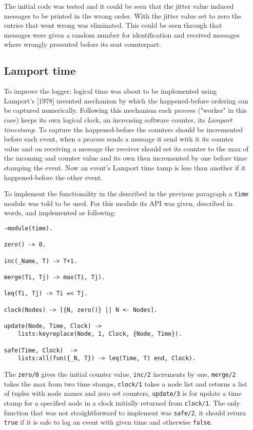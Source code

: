 \documentclass[a4paper, 11pt]{article}
\begin{document}
The initial code was tested and it could be seen that the jitter value induced messages to be printed in the wrong order. With the jitter value set to zero the entries that went wrong was eliminated. This could be seen through that messages were given a random number for identification and received messages where wrongly presented before its sent counterpart.

\subsection{Lamport time}

To improve the logger; logical time was about to be implemented using Lamport's [1978] invented mechanism by which the happened-before ordering can be captured numerically. Following this mechanism each process ("worker" in this case) keeps its own logical clock, an increasing software counter, its \textit{Lamport timestamp}. To capture the happened-before the counters should be incremented before each event, when a process sends a message it send with it its counter value and on receiving a message the receiver should set its counter to the max of the incoming and counter value and its own then incremented by one before time stamping the event. Now an event's Lamport time tamp is less than another if it happened-before the other event.

To implement the functionality in the described in the previous paragraph a \verb!time! module was told to be used. For this module its API was given, described in words, and implemented as following:

\begin{verbatim}
-module(time).

zero() -> 0.

inc(_Name, T) -> T+1.

merge(Ti, Tj) -> max(Ti, Tj).

leq(Ti, Tj) -> Ti =< Tj.

clock(Nodes) -> [{N, zero()} || N <- Nodes].

update(Node, Time, Clock) ->
    lists:keyreplace(Node, 1, Clock, {Node, Time}).

safe(Time, Clock)  ->
    lists:all(fun({_N, T}) -> leq(Time, T) end, Clock).
\end{verbatim}

The \verb!zero/0! gives the initial counter value, \verb!inc/2! increments by one, \verb!merge/2! takes the max from two time stamps, \verb!clock/1! takes a node list and returns a list of tuples with node names and zero set counters, \verb!update/3! is for update a time stamp for a specified node in a clock initially returned from \verb!clock/1!. The only function that was not straightforward to implement was \verb!safe/2!, it should return \verb!true! if it is safe to log an event with given time and otherwise \verb!false!.
\end{document}
